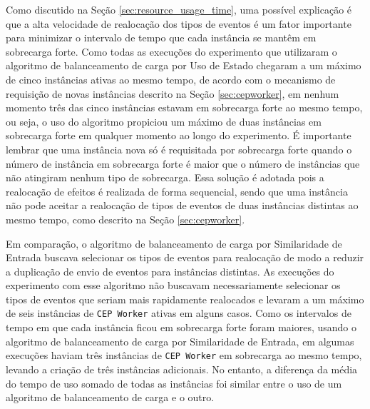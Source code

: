 


Como discutido na Seção \ref{sec:resource_usage_time}, uma possível explicação é que a alta velocidade de realocação dos tipos de eventos é um fator importante para minimizar o intervalo de tempo que cada instância se mantêm em sobrecarga forte. Como todas as execuções do experimento que utilizaram o algoritmo de balanceamento de carga por Uso de Estado chegaram a um máximo de cinco instâncias ativas ao mesmo tempo, de acordo com o mecanismo de requisição de novas instâncias descrito na Seção \ref{sec:cepworker}, em nenhum momento três das cinco instâncias estavam em sobrecarga forte ao mesmo tempo, ou seja, o uso do algoritmo propiciou um máximo de duas instâncias em sobrecarga forte em qualquer momento ao longo do experimento. É importante lembrar que uma instância nova só é requisitada por sobrecarga forte quando o número de instância em sobrecarga forte é maior que o número de instâncias que não atingiram nenhum tipo de sobrecarga. Essa solução é adotada pois a realocação de efeitos é realizada de forma sequencial, sendo que uma instância não pode aceitar a realocação de tipos de eventos de duas instâncias distintas ao mesmo tempo, como descrito na Seção \ref{sec:cepworker}.

Em comparação, o algoritmo de balanceamento de carga por Similaridade de Entrada buscava selecionar os tipos de eventos para realocação de modo a reduzir a duplicação de envio de eventos para instâncias distintas. As execuções do experimento com esse algoritmo não buscavam necessariamente selecionar os tipos de eventos que seriam mais rapidamente realocados e levaram a um máximo de seis instâncias de \texttt{CEP Worker} ativas em alguns casos. Como os intervalos de tempo em que cada instância ficou em sobrecarga forte foram maiores, usando o algoritmo de balanceamento de carga por Similaridade de Entrada, em algumas execuções haviam três instâncias de \texttt{CEP Worker} em sobrecarga ao mesmo tempo, levando a criação de três instâncias adicionais. No entanto, a diferença da média do tempo de uso somado de todas as instâncias foi similar entre o uso de um algoritmo de balanceamento de carga e o outro.




